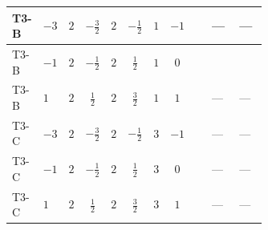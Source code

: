 \documentclass[8pt]{article}
\begin{document}
\begin{landscape}
\begin{longtable}{@{}llcccccc >{\raggedright\arraybackslash}p{0.21\linewidth} >{\raggedright\arraybackslash}p{0.21\linewidth} >{\raggedright\arraybackslash}p{0.21\linewidth}@{}}
\midrule
T3-B & $-3$ & $2$ & $-\frac{3}{2}$ & $2$ & $-\frac{1}{2}$ & $1$ & $-1$ & \scriptsize\adjustbox{max width=\linewidth}{$\begin{gathered} -\frac{15}{4} {g_1}^2 \left({y_2}\right)_{ij}\end{gathered}$} & --- & --- \\
\midrule
T3-B & $-1$ & $2$ & $-\frac{1}{2}$ & $2$ & $\frac{1}{2}$ & $1$ & $0$ & \scriptsize\adjustbox{max width=\linewidth}{$\begin{gathered} -\frac{3}{4} {g_1}^2 \left({y_2}\right)_{ij}\end{gathered}$} & \scriptsize\adjustbox{max width=\linewidth}{$\begin{gathered} \operatorname{Tr}\!\left({y_2}\,\left({y_1}\right)^{\dagger}\right) \left({y_1}\right)_{ij}\end{gathered}$} & \scriptsize\adjustbox{max width=\linewidth}{$\begin{gathered} +\frac{1}{2} (\left({y_1}\,\left({y_1}\right)^{\dagger}\,{y_2}\right)_{ij}+2 \left({y_2}\,\left({y_1}\right)^{\dagger}\,{y_1}\right)_{ij}+\left({Y_e}\,\left({Y_e}\right)^{\dagger}\,{y_2}\right)_{ij}+3 \left({y_2}\,\left({y_2}\right)^{\dagger}\,{y_2}\right)_{ij})\end{gathered}$} \\
\midrule
T3-B & $1$ & $2$ & $\frac{1}{2}$ & $2$ & $\frac{3}{2}$ & $1$ & $1$ & \scriptsize\adjustbox{max width=\linewidth}{$\begin{gathered} -\frac{15}{4} {g_1}^2 \left({y_2}\right)_{ij}\end{gathered}$} & --- & --- \\
\midrule
T3-C & $-3$ & $2$ & $-\frac{3}{2}$ & $2$ & $-\frac{1}{2}$ & $3$ & $-1$ & \scriptsize\adjustbox{max width=\linewidth}{$\begin{gathered} -\frac{15}{4} {g_1}^2 \left({y_2}\right)_{ij}\end{gathered}$} & --- & --- \\
\midrule
T3-C & $-1$ & $2$ & $-\frac{1}{2}$ & $2$ & $\frac{1}{2}$ & $3$ & $0$ & \scriptsize\adjustbox{max width=\linewidth}{$\begin{gathered} -\frac{3}{4} {g_1}^2 \left({y_2}\right)_{ij}\end{gathered}$} & --- & --- \\
\midrule
T3-C & $1$ & $2$ & $\frac{1}{2}$ & $2$ & $\frac{3}{2}$ & $3$ & $1$ & \scriptsize\adjustbox{max width=\linewidth}{$\begin{gathered} -\frac{15}{4} {g_1}^2 \left({y_2}\right)_{ij}\end{gathered}$} & --- & --- \\

\end{longtable}
\end{landscape}
\end{document}
